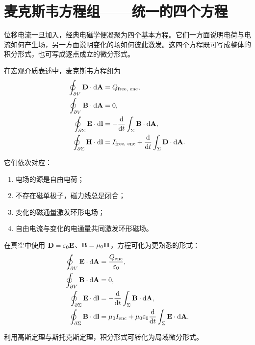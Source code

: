 \section{麦克斯韦方程组——统一的四个方程}

位移电流一旦加入，经典电磁学便凝聚为四个基本方程。它们一方面说明电荷与电流如何产生场，另一方面说明变化的场如何彼此激发。这四个方程既可写成整体的积分形式，也可写成逐点成立的微分形式。

\begin{law}[麦克斯韦方程组的积分形式]
在宏观介质表述中，麦克斯韦方程组为
\begin{align*}
\oint_{\partial V} \vb{D}\cdot \dd \vb{A} &= Q_{\text{free, enc}}, \\
\oint_{\partial V} \vb{B}\cdot \dd \vb{A} &= 0, \\
\oint_{\partial \Sigma} \vb{E}\cdot \dd \vb{l} &= -\dv{}{t}\int_{\Sigma}\vb{B}\cdot \dd \vb{A}, \\
\oint_{\partial \Sigma} \vb{H}\cdot \dd \vb{l} &= I_{\text{free, enc}}+\dv{}{t}\int_{\Sigma}\vb{D}\cdot \dd \vb{A}.
\end{align*}
\end{law}

它们依次对应：
\begin{enumerate}
  \item 电场的源是自由电荷；
  \item 不存在磁单极子，磁力线总是闭合；
  \item 变化的磁通量激发环形电场；
  \item 自由电流与变化的电通量共同激发环形磁场。
\end{enumerate}

在真空中使用 $\vb{D}=\varepsilon_0\vb{E}$、$\vb{B}=\mu_0\vb{H}$，方程可化为更熟悉的形式：
\begin{align*}
\oint_{\partial V} \vb{E}\cdot \dd \vb{A} &= \frac{Q_{\text{enc}}}{\varepsilon_0}, \\
\oint_{\partial V} \vb{B}\cdot \dd \vb{A} &= 0, \\
\oint_{\partial \Sigma} \vb{E}\cdot \dd \vb{l} &= -\dv{}{t}\int_{\Sigma}\vb{B}\cdot \dd \vb{A}, \\
\oint_{\partial \Sigma} \vb{B}\cdot \dd \vb{l} &= \mu_0 I_{\text{enc}}+\mu_0\varepsilon_0\dv{}{t}\int_{\Sigma}\vb{E}\cdot \dd \vb{A}.
\end{align*}

利用高斯定理与斯托克斯定理，积分形式可转化为局域微分形式。

